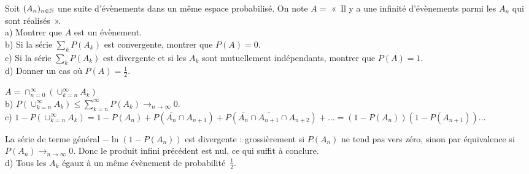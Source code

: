 \documentclass{book}
\begin{document}
\begin{Exercice}
Soit $(A_n)_{n\in \mathbb{N}}$ une suite d'évènements dans un même espace probabilisé.
On note 
$A =$ «~Il y a une infinité d'évènements parmi les $A_n$ qui sont réalisés~».\\
a) Montrer que $A$ est un évènement.\\
b) Si la série $\sum_k P(A_k)$ est convergente, montrer que $P(A)=0$.\\
c) Si la série $\sum_k P(A_k)$ est divergente et si les $A_k$ sont mutuellement
    indépendants, montrer que ${P(A)=1}$.\\
d) Donner un cas où $P(A)=\frac12$.
   
\begin{Correction}
$A = \cap_{n=0}^\infty(\cup_{k=n}^\infty A_k)$\\
b) $P(\cup_{k=n}^\infty A_k)\leq \sum_{k=n}^\infty P(A_k)\rightarrow_{n\rightarrow \infty}0$.\\c) $1-P(\cup_{k=n}^\infty A_k) = 1-P(A_n) + P(\overline{A_n}\cap A_{n+1})+ P(\overline{A_n}\cap\overline{A_{n+1}}\cap A_{n+2})+\ldots                   =(1-P(A_n))(1-P(A_{n+1}))\ldots $

    La série de terme général $-\ln(1-P(A_n))$ est divergente : grossièrement   si $P(A_n)$ ne tend pas vers zéro, sinon par équivalence si  $P(A_n)\to_{n\to \infty}0$. Donc le produit infini précédent est nul, ce qui suffit à conclure.\\
    d) Tous les $A_k$ égaux à un même évènement de probabilité~$\frac12$.
\end{Correction}
\end{Exercice}
\end{document}
